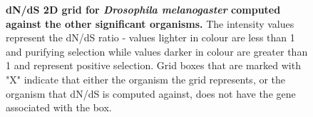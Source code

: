 \documentclass{article}
\begin{document}
\begin{figure}[H]
\centering
{}
\caption{\textbf{dN/dS 2D grid for \textit{Drosophila melanogaster} computed against the other significant organisms.} The intensity values represent the dN/dS ratio - values lighter in colour are less than 1 and purifying selection while values darker in colour are greater than 1 and represent positive selection. Grid boxes that are marked with "X" indicate that either the organism the grid represents, or the organism that dN/dS is computed against, does not have the gene associated with the box.}
\label{sup_fig_24}
\end{figure}
\end{document}
